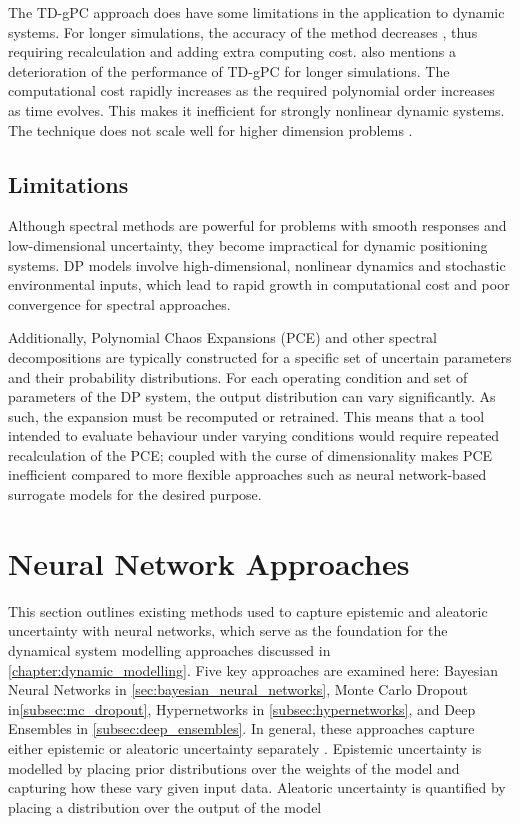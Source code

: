 The TD-gPC approach does have some limitations in the application to dynamic systems. For longer simulations, the
accuracy of the method decreases \parencite{gerritsmaTimedependentGeneralizedPolynomial2010}, thus requiring recalculation
and adding extra computing cost. \textcite{ebadollahiTimedependentUncertaintyQuantification2025} also mentions a
deterioration of the performance of TD-gPC for longer simulations. The computational cost rapidly increases as the
required polynomial order increases as time evolves. This makes it inefficient for strongly nonlinear dynamic systems.
The technique does not scale well for higher dimension problems
\parencites{heuvelineHybridGeneralizedPolynomial2014}{maiSurrogateModellingStochastic2016}. 

\subsection{Limitations}
\label{subsec:limitations}
Although spectral methods are powerful for problems with smooth responses and low-dimensional uncertainty, they become
impractical for dynamic positioning systems. DP models involve high-dimensional, nonlinear dynamics and stochastic
environmental inputs, which lead to rapid growth in computational cost and poor convergence for spectral approaches.

Additionally, Polynomial Chaos Expansions (PCE) and other spectral decompositions are typically constructed for a
specific set of uncertain parameters and their probability distributions. For each operating condition and set of
parameters of the DP system, the output distribution can vary significantly. As such, the expansion must be recomputed
or retrained. This means that a tool intended to evaluate behaviour under varying conditions would require repeated
recalculation of the PCE; coupled with the curse of dimensionality makes PCE inefficient compared to more flexible approaches such as neural network-based
surrogate models for the desired purpose.

\section{Neural Network Approaches}
\label{sec:neural_network_uq}
This section outlines existing methods used to capture epistemic and aleatoric uncertainty with neural networks, which
serve as the foundation for the dynamical system modelling approaches discussed in \cref{chapter:dynamic_modelling}.
Five key approaches are examined here: Bayesian Neural Networks in \cref{sec:bayesian_neural_networks}, Monte Carlo
Dropout in\cref{subsec:mc_dropout}, Hypernetworks in \cref{subsec:hypernetworks}, and Deep Ensembles
in \cref{subsec:deep_ensembles}. In
general, these approaches capture either epistemic or aleatoric uncertainty separately \parencite{galUncertaintyDeepLearning2016}. Epistemic uncertainty is modelled by
placing prior distributions over the weights of the model and capturing how these vary given input data. Aleatoric
uncertainty is quantified by placing a distribution over the output of the model \parencite{kendallWhatUncertaintiesWe2017}

